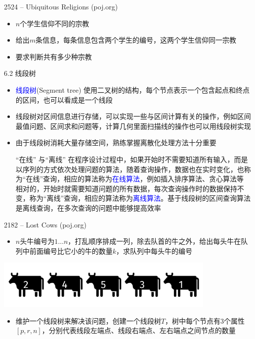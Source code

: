 \begin{frame}{2524 -- Ubiquitous Religions (poj.org)}
    \begin{itemize}
        \item $n$个学生信仰不同的宗教
        \vfill
        \item 给出$m$条信息，每条信息包含两个学生的编号，这两个学生信仰同一宗教
        \vfill
        \item 要求判断共有多少种宗教
    \end{itemize}
\end{frame}
\begin{frame}{6.2 线段树}
    \begin{itemize}
        \item \textcolor{blue}{线段树}(Segment tree) 使用二叉树的结构，每个节点表示一个包含起点和终点的区间，也可以看成是一个线段
        \vfill
        \item 线段树对区间信息进行存储，可以实现一些与区间计算有关的操作，例如区间最值问题、区间求和问题等，计算几何里面扫描线的操作也可以用线段树实现
        \vfill
        \item 由于线段树消耗大量存储空间，熟练掌握离散化处理方法十分重要
        \begin{block}{“在线” 与“离线”}
            \scriptsize{
                \quad 在程序设计过程中，如果开始时不需要知道所有输入，而是以序列的方式依次处理问题的算法，随着查询操作，数据也在实时变化，也称为“在线”查询，相应的算法称为\textcolor{blue}{在线算法}，例如插入排序算法、贪心算法等\\
                \quad 相对的，开始时就需要知道问题的所有数据，每次查询操作时的数据保持不变，称为“离线”查询，相应的算法称为\textcolor{blue}{离线算法}。基于线段树的区间查询算法是离线查询，在多次查询的问题中能够提高效率}
        \end{block}
    \end{itemize}
\end{frame}
\begin{frame}{2182 -- Lost Cows (poj.org)}
    \begin{itemize}
        \item  $n$头牛编号为$1…n$，打乱顺序排成一列，除去队首的牛之外，给出每头牛在队列中前面编号比它小的牛的数量$k$，求队列中每头牛的编号
    \end{itemize}
    \includegraphics[width=0.8\textwidth,center]{fig/6-11.pdf}
    \begin{itemize}
        \item  维护一个线段树来解决该问题，创建一个线段树$T$，树中每个节点有3个属性$[p,r,n]$，分别代表线段左端点、线段右端点、左右端点之间节点的数量
    \end{itemize}
\end{frame}
